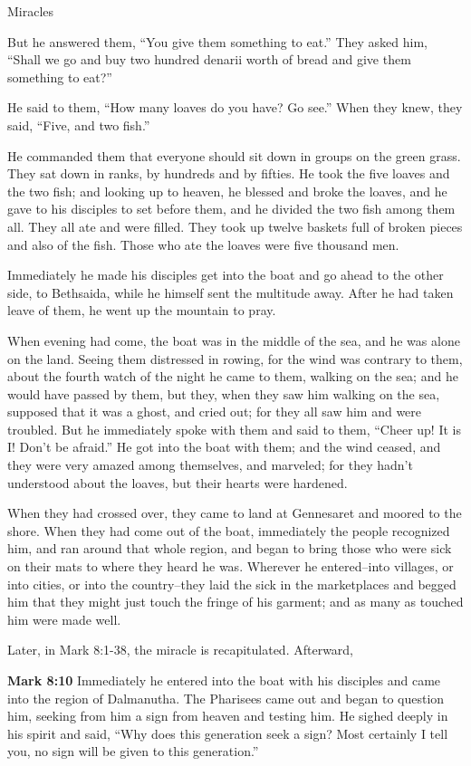 \documentclass[10pt,twoside]{article} %
\newcommand{\quotesize}{\normalsize{}}
\newcommand{\comm}[1]{\begingroup \color{black!50} #1\endgroup}
\newenvironment{quotetext}{\begingroup\quotesize}{\endgroup}
\newcommand{\bible}[2]{\begin{quotetext}\textbf{#1} #2\end{quotetext}}
\newcommand{\gospelmark}[2]{\bible{Mark #1}{#2}}
\begin{document}
\begin{section}{Miracles}
{  But he answered them, ``You give them something to eat.''
They asked him, ``Shall we go and buy two hundred denarii worth of bread and give them something to eat?''

  He said to them, ``How many loaves do you have? Go see.''
When they knew, they said, ``Five, and two fish.''

  He commanded them that everyone should sit down in groups on the green grass.   They sat down in ranks, by hundreds and by fifties.   He took the five loaves and the two fish; and looking up to heaven, he blessed and broke the loaves, and he gave to his disciples to set before them, and he divided the two fish among them all.   They all ate and were filled.   They took up twelve baskets full of broken pieces and also of the fish.   Those who ate the loaves were five thousand men.

  Immediately he made his disciples get into the boat and go ahead to the other side, to Bethsaida, while he himself sent the multitude away.   After he had taken leave of them, he went up the mountain to pray.

  When evening had come, the boat was in the middle of the sea, and he was alone on the land.   Seeing them distressed in rowing, for the wind was contrary to them, about the fourth watch of the night he came to them, walking on the sea;  and he would have passed by them,   but they, when they saw him walking on the sea, supposed that it was a ghost, and cried out;   for they all saw him and were troubled. But he immediately spoke with them and said to them, ``Cheer up! It is I! Don't be afraid.''   He got into the boat with them; and the wind ceased, and they were very amazed among themselves, and marveled;   for they hadn't understood about the loaves, but their hearts were hardened.

  When they had crossed over, they came to land at Gennesaret and moored to the shore.   When they had come out of the boat, immediately the people recognized him,   and ran around that whole region, and began to bring those who were sick on their mats to where they heard he was.   Wherever he entered--into villages, or into cities, or into the country--they laid the sick in the marketplaces and begged him that they might just touch the fringe of his garment; and as many as touched him were made well.
}

\comm{Later, in Mark 8:1-38, the miracle is recapitulated. Afterward,}

\gospelmark{8:10}{
Immediately he entered into the boat with his disciples and came into the region of Dalmanutha.   The Pharisees came out and began to question him, seeking from him a sign from heaven and testing him.   He sighed deeply in his spirit and said, ``Why does this generation seek a sign? Most certainly I tell you, no sign will be given to this generation.''
}


\end{section}
\end{document}
